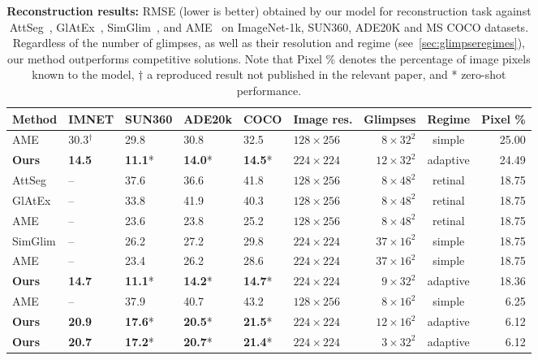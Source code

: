 \begin{table}[t]
\caption{\textbf{Reconstruction results:} RMSE (lower is better) obtained by our model for reconstruction task against AttSeg~\protect\cite{seifi2020attend}, GlAtEx~\protect\cite{seifi2021glimpse}, SimGlim~\protect\cite{jha2023simglim}, and AME~\cite{pardyl2023active} on ImageNet-1k, SUN360, ADE20K and MS COCO datasets. Regardless of the number of glimpses, as well as their resolution and regime (see~\cref{sec:glimpseregimes}), our method outperforms competitive solutions. Note that Pixel \% denotes the percentage of image pixels known to the model, $\dag$ a reproduced result not published in the relevant paper, and * zero-shot performance.}
\label{tab:reconstruction}
\begin{center}
\begin{small}
\vspace{-.2cm}
\begin{tabular}{l@{\hskip6pt}lllllr@{\hskip8pt}cr}
\toprule
Method & IMNET & SUN360 & ADE20k & COCO & Image res. & Glimpses & Regime & Pixel \% \\
\midrule
AME & 30.3$^\dag$ & 29.8 & 30.8 & 32.5 & $128 \times 256$ & $8 \times 32^2$ &simple & 25.00 \\
\textbf{Ours} & \textbf{14.5} & \textbf{11.1}* & \textbf{14.0}* & \textbf{14.5}* & $224 \times 224$ & $12 \times 32^2$ & adaptive & 24.49 \\
\midrule
AttSeg &-- & 37.6 & 36.6 & 41.8 & $128 \times 256$ & $8 \times 48^2$ &retinal & 18.75 \\
GlAtEx & --& 33.8 & 41.9 & 40.3 & $128 \times 256$ & $8 \times 48^2$ &retinal & 18.75 \\
AME & --& 23.6 & 23.8 & 25.2 & $128 \times 256$ & $8 \times 48^2$ & retinal & 18.75 \\
SimGlim &-- & 26.2 & 27.2 & 29.8 & $224 \times 224$ & $37 \times 16^2$ &simple & 18.75 \\
AME & --& 23.4 & 26.2 & 28.6 & $224 \times 224$ & $37 \times 16^2$ & simple & 18.75 \\
\textbf{Ours} & \textbf{14.7} & \textbf{11.1}* & \textbf{14.2}* & \textbf{14.7}* & $224 \times 224$ & $9 \times 32^2$ & adaptive & 18.36 \\
\midrule
AME & --& 37.9 & 40.7 & 43.2 & $128 \times 256$ & $8 \times 16^2$ & simple & 6.25 \\
\textbf{Ours} & \textbf{20.9} & \textbf{17.6}* & \textbf{20.5}* & \textbf{21.5}* & $224 \times 224$ & $12 \times 16^2$ & adaptive & 6.12 \\
\textbf{Ours} & \textbf{20.7} & \textbf{17.2}* & \textbf{20.7}* & \textbf{21.4}* & $224 \times 224$ & $3 \times 32^2$ & adaptive & 6.12 \\
\bottomrule
\end{tabular}
\end{small}
\end{center}
\end{table}